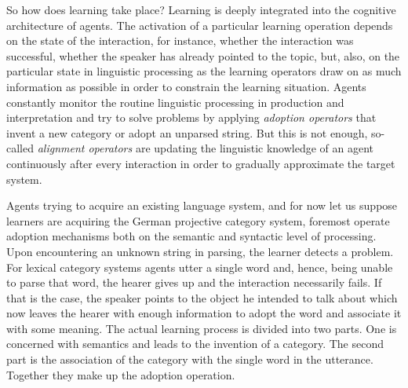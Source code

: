 So how does learning take place? Learning is deeply integrated into the cognitive architecture 
of agents. The activation of a particular learning operation depends on the state of the interaction, 
for instance, whether the interaction was successful, whether the speaker has already pointed to the topic,
but, also, on the particular state in linguistic processing as the learning operators draw on as 
much information as possible in order to constrain the learning situation. 
Agents constantly monitor the routine linguistic processing in production and interpretation 
and try to solve problems by applying \emph{adoption operators} that invent a new category or adopt 
an unparsed string.  But this is not enough, so-called \emph{alignment operators} are 
updating the linguistic knowledge of an agent continuously after every interaction
in order to gradually approximate the target system.

Agents trying to acquire an existing language system, and for now 
let us suppose learners are acquiring the German projective category system, 
foremost operate adoption mechanisms both on the 
semantic and syntactic level of processing. Upon encountering an unknown 
string in parsing, the learner detects a problem. For lexical category systems
agents utter a single word and, hence, being unable to parse that
word, the hearer gives up and the interaction necessarily fails. 
If that is the case, the speaker points to the object he intended to talk about 
which now leaves the hearer with enough information to adopt the word 
and associate it with some meaning. The actual learning process is divided into two parts. 
One is concerned with semantics and leads to the invention of a category. 
The second part is the association of the category with the single word in 
the utterance. Together they make up the adoption operation.

